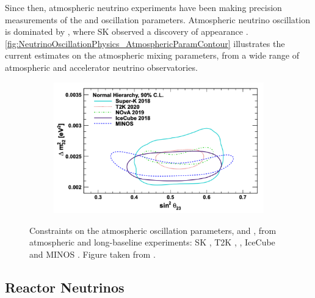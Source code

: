 Since then, atmospheric neutrino experiments have been making precision measurements of the  and  oscillation parameters.
Atmospheric neutrino oscillation is dominated by , where SK observed a \quickmath{4.6\sigma} discovery of \quickmath{\nu_{\tau}} appearance \cite{Li_2018}. \autoref{fig:NeutrinoOscillationPhysics_AtmosphericParamContour} illustrates the current estimates on the atmospheric mixing parameters, from a wide range of atmospheric and accelerator neutrino observatories.

\begin{figure}[h]
  \begin{subfigure}[t]{0.90\textwidth}
    \includegraphics[width=\textwidth, trim={0mm 0mm 0mm 0mm}, clip,page=1]{Figures/Theory/AtmosphericParams.pdf}
  \end{subfigure}
  \caption{Constraints on the atmospheric oscillation parameters,  and , from atmospheric and long-baseline experiments: SK \cite{Kamiokande_Collaboration2017-nf}, T2K \cite{T2K_Collaboration2018-sm},  \cite{Acero2019-rw}, IceCube \cite{Aartsen2018-cz} and MINOS \cite{Adamson2014-tt}. Figure taken from \cite{Athar_2022}.}
  \label{fig:NeutrinoOscillationPhysics_AtmosphericParamContour}
\end{figure}

\subsection{Reactor Neutrinos}
\label{subsec:NeutrinoOscillationPhysics_ReactorNeutrinos}

